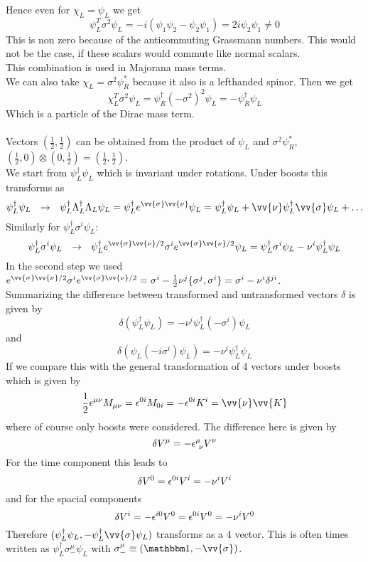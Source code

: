 Hence even for $\chi_L = \psi_L$ we get
\[ \psi_L^T \sigma^2 \psi_L = - i( \psi_1 \psi_2 - \psi_2 \psi_1) = 2i \psi_2 \psi_1 \neq 0\]
This is non zero because of the anticommuting Grassmann numbers. This would not be the case, if these scalars would commute like normal scalars.\\
This combination is used in Majorana mass terms.\\
We can also take $\chi_L = \sigma^2\psi_R^*$ because it also is a lefthanded spinor. Then we get
\[\chi_L^T \sigma^2 \psi_L = \psi^\dagger_R(-\sigma^2)^2 \psi_L = - \psi_R^\dagger \psi_L\]
Which is a particle of the Dirac mass term.\\
\\
Vectors $\left(\frac{1}{2},\frac{1}{2}\right)$ can be obtained from the product of $\psi_L$ and $\sigma^2\psi_R^*$, $\left(\frac{1}{2}, 0 \right) \otimes \left(0,\frac{1}{2}\right) = \left(\frac{1}{2},\frac{1}{2}\right)$. \\
We start from $\psi_L^\dagger \psi_L$ which is invariant under rotations. Under boosts this transforms as 
\[ \psi_L^\dagger \psi_L ~~\df~~ \psi_L^\dagger \Lambda_L^\dagger \Lambda_L \psi_L = \psi_L^\dagger e^{\vv{\sigma}\vv{\nu}} \psi_L = \psi_L^\dagger \psi_L + \vv{\nu} \psi_L^\dagger \vv{\sigma} \psi_L + \ldots\]
Similarly for $\psi_L^\dagger \sigma^i \psi_L$:
\[ \psi_L^\dagger \sigma^i \psi_L ~~\df~~ \psi_L^\dagger e^{\vv{\sigma}\vv{\nu}/2} \sigma^i e^{\vv{\sigma}\vv{\nu}/2} \psi_L = \psi_L^\dagger \sigma^i \psi_L - \nu^i \psi_L^\dagger \psi_L\]
In the second step we used $e^{\vv{\sigma}\vv{\nu}/2} \sigma^i e^{\vv{\sigma}\vv{\nu}/2} = \sigma^i - \frac{1}{2} \nu^j \{\sigma^j,\sigma^i\} = \sigma^i - \nu^i \delta^{ji}$.\\
Summarizing the difference between transformed and untransformed vectors $\delta$ is given by
\[ \delta(\psi_L^\dagger \psi_L) = - \nu^i \psi_L^\dagger (-\sigma^i) \psi_L\]
and
\[ \delta( \psi_L(-i\sigma^i) \psi_L) = -\nu^i \psi^\dagger_L \psi_L\]
If we compare this with the general transformation of 4 vectors under boosts which is given by
\[ \frac{1}{2} \eps^{\mu\nu} M_{\mu\nu} = \eps^{0i} M_{0i} = - \eps^{0i}K^i = \vv{\nu}\vv{K} \]
where of course only boosts were considered. The difference here is given by
\[ \delta V^\mu = - \epsilon^\mu_{~\nu} V^\nu\]
For the time component this leads to
\[ \delta V^0 = \epsilon^{0i} V^i = - \nu^i V^i\]
and for the spacial components
\[ \delta V^i = - \epsilon^{i0} V^0 = \epsilon^{0i} V^0 =  -\nu^i V^0\]
Therefore $( \psi_L^\dagger \psi_L, - \psi_L^\dagger \vv{\sigma} \psi_L)$ transforms as a 4 vector. This is often times written as $\psi_L ^\dagger \sigma_-^\mu \psi_L$ with $\sigma_-^\mu \equiv (\ehm, - \vv{\sigma})$.\\
